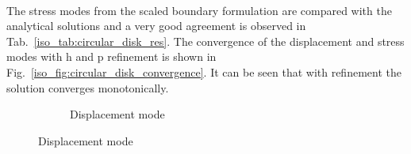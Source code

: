 \paragraph{}
The stress modes from the scaled boundary formulation are compared with the analytical solutions and a very good agreement is observed in Tab.~\ref{iso_tab:circular_disk_res}.
The convergence of the displacement and stress modes with h and p refinement is shown in Fig.~\ref{iso_fig:circular_disk_convergence}.
It can be seen that with refinement the solution converges monotonically.
    \begin{figure}[h!]
        \begin{subfigure}[b]{1\linewidth}
            \centering
            \caption{Displacement mode}
        \end{subfigure}


\end{figure}

